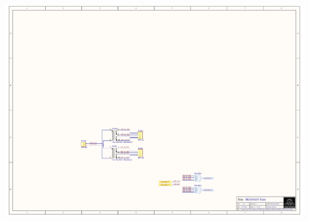 \includegraphics[page=7,height=\textheight,width=\textwidth,keepaspectratio]{TK520_GDT-Trafo.PDF}
%

